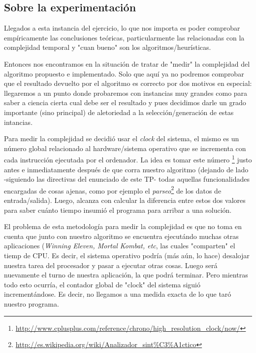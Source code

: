 {}
\subsection*{Sobre la experimentaci\'on}
\par Llegados a esta instancia del ejercicio, lo que nos importa es poder
    comprobar emp\'iricamente las conclusiones te\'oricas, particularmente
    las relacionadas con la complejidad temporal y "cuan bueno" son los
    algoritmos/heur\'isticas.

\par Entonces nos encontramos en la situaci\'on de tratar de "medir"
    la complejidad del algoritmo propuesto e implementado. Solo que aqu\'i ya no podremos
    comprobar que el resultado devuelto por el algoritmo es correcto por dos
    motivos en especial: llegaremos a un punto donde probaremos con instancias
    muy grandes como para saber a ciencia cierta cual debe ser el resultado y
    pues decidimos darle un grado importante (sino principal) de aletoriedad
    a la selecci\'on/generaci\'on de estas intancias.

\par Para medir la complejidad se decidi\'o usar el \emph{clock} del sistema,
    el mismo es un n\'umero global relacionado al hardware/sistema operativo
    que se incrementa con cada instrucci\'on ejecutada por el ordenador. La idea
    es tomar este n\'umero \footnote{%
    \url{http://www.cplusplus.com/reference/chrono/high_resolution_clock/now/}}
    justo antes e inmediatamente despu\'es de que corra nuestro algoritmo
    (dejando de lado -siguiendo las directivas del enunciado de este TP-
    todas aquellas funcionalidades encargadas de cosas ajenas, como
    por ejemplo el \emph{parseo}\footnote{%
    \url{http://es.wikipedia.org/wiki/Analizador_sint\%C3\%A1ctico}} de los datos
    de entrada/salida). Luego, alcanza con calcular la diferencia entre estos dos
    valores para saber cu\'anto tiempo insumi\'o el programa para arribar a una soluci\'on.

\par El problema de esta metodolog\'ia para medir la complejidad es que no
    toma en cuenta que junto con nuestro algoritmo se encuentra ejecut\'ando
    muchas otras aplicaciones (\emph{Winning Eleven, Mortal Kombat, etc}, las
    cuales "comparten" el tiemp de CPU. Es decir, el sistema operativo podr\'ia
    (m\'as a\'un, lo hace) desalojar nuestra tarea del procesador y pasar a
    ejecutar otras cosas. Luego ser\'a nuevamente el turno de nuestra
    aplicaci\'on, la que podr\'a terminar. Pero mientras todo esto ocurr\'ia,
    el contador global de "clock" del sistema sigui\'o increment\'andose. Es
    decir, no llegamos a una medida exacta de lo que tar\'o nuestro programa.

